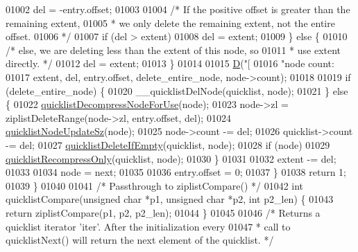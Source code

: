 \begin{DoxyCode}
{{{{{{01002             del = -entry.offset;
01003 
01004             \textcolor{comment}{/* If the positive offset is greater than the remaining extent,}
01005 \textcolor{comment}{             * we only delete the remaining extent, not the entire offset.}
01006 \textcolor{comment}{             */}
01007             \textcolor{keywordflow}{if} (del > extent)
01008                 del = extent;
01009         \} \textcolor{keywordflow}{else} \{
01010             \textcolor{comment}{/* else, we are deleting less than the extent of this node, so}
01011 \textcolor{comment}{             * use extent directly. */}
01012             del = extent;
01013         \}
01014 
01015         \hyperlink{debugmacro_8h_a74021f021dcdfbb22891787b79c5529d}{D}(\textcolor{stringliteral}{"[%
01016           \textcolor{stringliteral}{"node count: %
01017           extent, del, entry.offset, delete\_entire\_node, node->count);
01018 
01019         \textcolor{keywordflow}{if} (delete\_entire\_node) \{
01020             \_\_quicklistDelNode(quicklist, node);
01021         \} \textcolor{keywordflow}{else} \{
01022             \hyperlink{quicklist_8c_a2f30e6f482d51059f06fa34df69734e1}{quicklistDecompressNodeForUse}(node);
01023             node->zl = ziplistDeleteRange(node->zl, entry.offset, del);
01024             \hyperlink{quicklist_8c_a03a3947a9423d234923343702619c553}{quicklistNodeUpdateSz}(node);
01025             node->count -= del;
01026             quicklist->count -= del;
01027             \hyperlink{quicklist_8c_a07248675edc895a03df4c9dddced0740}{quicklistDeleteIfEmpty}(quicklist, node);
01028             \textcolor{keywordflow}{if} (node)
01029                 \hyperlink{quicklist_8c_a75672a682e90fe973934910f3ee866a3}{quicklistRecompressOnly}(quicklist, node);
01030         \}
01031 
01032         extent -= del;
01033 
01034         node = next;
01035 
01036         entry.offset = 0;
01037     \}
01038     \textcolor{keywordflow}{return} 1;
01039 \}
01040 
01041 \textcolor{comment}{/* Passthrough to ziplistCompare() */}
01042 \textcolor{keywordtype}{int} quicklistCompare(\textcolor{keywordtype}{unsigned} \textcolor{keywordtype}{char} *p1, \textcolor{keywordtype}{unsigned} \textcolor{keywordtype}{char} *p2, \textcolor{keywordtype}{int} p2\_len) \{
01043     \textcolor{keywordflow}{return} ziplistCompare(p1, p2, p2\_len);
01044 \}
01045 
01046 \textcolor{comment}{/* Returns a quicklist iterator 'iter'. After the initialization every}
01047 \textcolor{comment}{ * call to quicklistNext() will return the next element of the quicklist. */}
}}}}}}}}
\end{DoxyCode}
